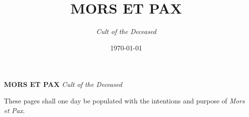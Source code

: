\documentclass[openany]{book}
\title{\Huge MORS ET PAX}
\author{\emph{Cult of the Deceased}}
\date{\today}
\begin{document}
	
	\frontmatter
	
	\begin{titlepage}
		\begin{center}
			\vfill
			{\Huge \textbf{MORS ET PAX}}
			\vfill
			{\large \emph{Cult of the Deceased}}\\
			\vfill
		\end{center}
	\end{titlepage}
	
	\newpage
	
	These pages shall one day be populated with the intentions and purpose of \emph{Mors et Pax}.
	
	
	\mainmatter
	
	\backmatter
	
	
\end{document}
